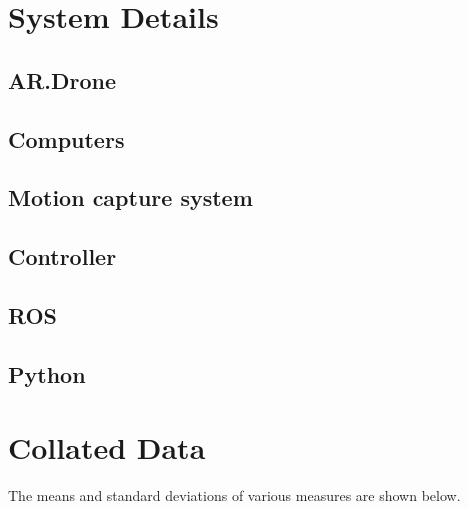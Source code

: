 \appendix
\chapter{System Details}
\section{AR.Drone}
\section{Computers}  %
\section{Motion capture system}
\section{Controller}
\section{ROS}  %
\section{Python}

\chapter{Collated Data}
The means and standard deviations of various measures are shown below.

